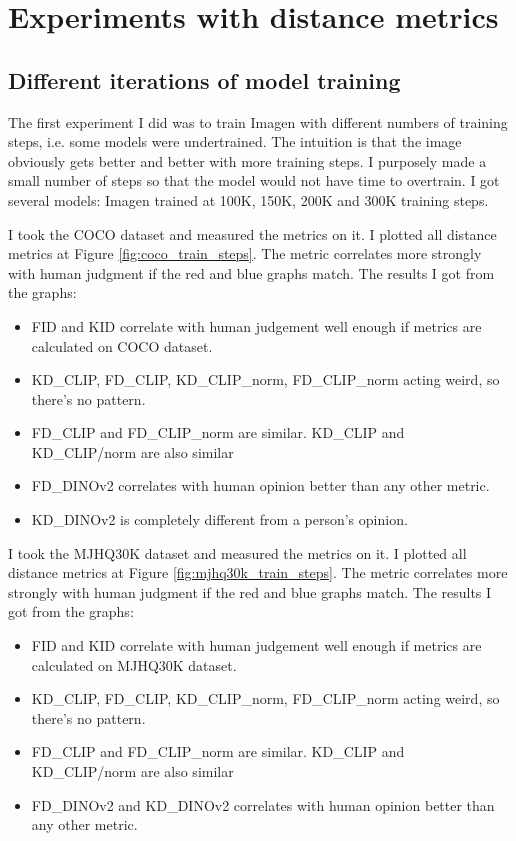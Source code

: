 \section{Experiments with distance metrics}
\subsection{Different iterations of model training}
The first experiment I did was to train Imagen with different numbers of training steps, i.e. some models were undertrained. The intuition is that the image obviously gets better and better with more training steps. I purposely made a small number of steps so that the model would not have time to overtrain. I got several models: Imagen trained at 100K, 150K, 200K and 300K training steps.

I took the COCO dataset and measured the metrics on it. I plotted all distance metrics at Figure \ref{fig:coco_train_steps}. The metric correlates more strongly with human judgment if the red and blue graphs match.
The results I got from the graphs:
\begin{itemize}
    \item FID and KID correlate with human judgement well enough if metrics are calculated on COCO dataset.
    \item KD\_CLIP, FD\_CLIP, KD\_CLIP\_norm, FD\_CLIP\_norm acting weird, so there's no pattern.
    \item FD\_CLIP and FD\_CLIP\_norm are similar. KD\_CLIP and KD\_CLIP/norm are also similar
    \item FD\_DINOv2 correlates with human opinion better than any other metric.
    \item KD\_DINOv2 is completely different from a person's opinion.
\end{itemize}

I took the MJHQ30K dataset and measured the metrics on it. I plotted all distance metrics at Figure \ref{fig:mjhq30k_train_steps}. The metric correlates more strongly with human judgment if the red and blue graphs match.
The results I got from the graphs:
\begin{itemize}
    \item FID and KID correlate with human judgement well enough if metrics are calculated on MJHQ30K dataset.
    \item KD\_CLIP, FD\_CLIP, KD\_CLIP\_norm, FD\_CLIP\_norm acting weird, so there's no pattern.
    \item FD\_CLIP and FD\_CLIP\_norm are similar. KD\_CLIP and KD\_CLIP/norm are also similar
    \item FD\_DINOv2 and KD\_DINOv2 correlates with human opinion better than any other metric.
\end{itemize}

